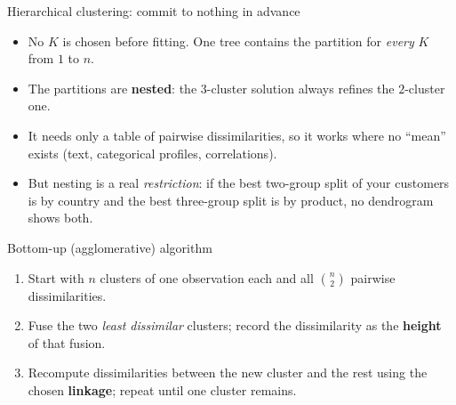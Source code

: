 \documentclass[aspectratio=169,11pt]{beamer}
\begin{document}
\begin{frame}{Hierarchical clustering: commit to nothing in advance}
  \footnotesize
  \begin{readme}
    \begin{itemize}
      \item No $K$ is chosen before fitting. One tree contains the partition for
            \emph{every} $K$ from $1$ to $n$.
      \item The partitions are \textbf{nested}: the $3$-cluster solution always refines the
            $2$-cluster one.
      \item It needs only a table of pairwise dissimilarities, so it works where no
            ``mean'' exists (text, categorical profiles, correlations).
      \item But nesting is a real \emph{restriction}: if the best two-group split of your
            customers is by country and the best three-group split is by product, no
            dendrogram shows both.
    \end{itemize}
  \end{readme}
  \begin{block}{Bottom-up (agglomerative) algorithm}
    \begin{enumerate}
      \item Start with $n$ clusters of one observation each and all $\binom{n}{2}$
            pairwise dissimilarities.
      \item Fuse the two \emph{least dissimilar} clusters; record the dissimilarity as the
            \textbf{height} of that fusion.
      \item Recompute dissimilarities between the new cluster and the rest using the chosen
            \textbf{linkage}; repeat until one cluster remains.
    \end{enumerate}
  \end{block}
\end{frame}
\end{document}
